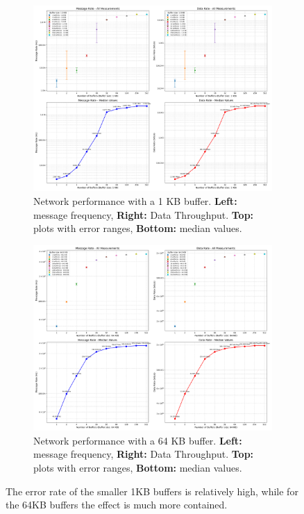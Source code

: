\begin{figure}[htbp]
\centering
\begin{subfigure}[b]{0.7\textwidth}
    \centering
    \includegraphics[width=\textwidth]{images/results/libfabric_throughput_analysis_1K.png}
    \caption{Network performance with a 1 KB buffer. \textbf{Left:} message frequency, \textbf{Right:} Data Throughput. \textbf{Top:} plots with error ranges, \textbf{Bottom:} median values.}
    \label{fig:1kb-buffer-throughput}
\end{subfigure}
\vspace{0.2cm}
\begin{subfigure}[b]{0.7\textwidth}
    \centering
    \includegraphics[width=\textwidth]{images/results/libfabric_throughput_analysis_64K.png}
    \caption{Network performance with a 64 KB buffer. \textbf{Left:} message frequency, \textbf{Right:} Data Throughput. \textbf{Top:} plots with error ranges, \textbf{Bottom:} median values.}
    \label{fig:64kb-buffer-throughput}
\end{subfigure}
\caption{The error rate of the smaller 1KB buffers is relatively high, while for the 64KB buffers the effect is much more contained.}
\label{fig:throughput-of-the-extremes-1K-64K}
\end{figure}

